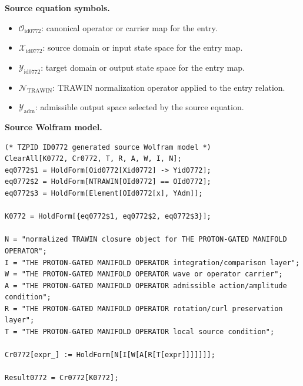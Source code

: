 \begin{minipage}[t]{0.49\linewidth}
\begingroup
\small
\raggedright
\textbf{Source equation symbols.}\par
\begin{itemize}[leftmargin=1.35em,itemsep=1pt,topsep=1pt,parsep=0pt]
    \item $\mathcal{O}_{\mathrm{id0772}}$: canonical operator or carrier map for the entry.
    \item $\mathcal{X}_{\mathrm{id0772}}$: source domain or input state space for the entry map.
    \item $\mathcal{Y}_{\mathrm{id0772}}$: target domain or output state space for the entry map.
    \item $\mathcal{N}_{\mathrm{TRAWIN}}$: TRAWIN normalization operator applied to the entry relation.
    \item $\mathcal{Y}_{\mathrm{adm}}$: admissible output space selected by the source equation.
\end{itemize}
\endgroup
\end{minipage}\hfill
\begin{minipage}[t]{0.47\linewidth}
\begingroup
\scriptsize
\raggedright
\textbf{Source Wolfram model.}\par
\begin{Verbatim}[fontsize=\tiny,breaklines=true,breakanywhere=true]
(* TZPID ID0772 generated source Wolfram model *)
ClearAll[K0772, Cr0772, T, R, A, W, I, N];
eq0772$1 = HoldForm[Oid0772[Xid0772] -> Yid0772];
eq0772$2 = HoldForm[NTRAWIN[OId0772] == OId0772];
eq0772$3 = HoldForm[Element[OId0772[x], YAdm]];

K0772 = HoldForm[{eq0772$1, eq0772$2, eq0772$3}];

N = "normalized TRAWIN closure object for THE PROTON-GATED MANIFOLD OPERATOR";
I = "THE PROTON-GATED MANIFOLD OPERATOR integration/comparison layer";
W = "THE PROTON-GATED MANIFOLD OPERATOR wave or operator carrier";
A = "THE PROTON-GATED MANIFOLD OPERATOR admissible action/amplitude condition";
R = "THE PROTON-GATED MANIFOLD OPERATOR rotation/curl preservation layer";
T = "THE PROTON-GATED MANIFOLD OPERATOR local source condition";

Cr0772[expr_] := HoldForm[N[I[W[A[R[T[expr]]]]]]];

Result0772 = Cr0772[K0772];
\end{Verbatim}
\endgroup
\end{minipage}


